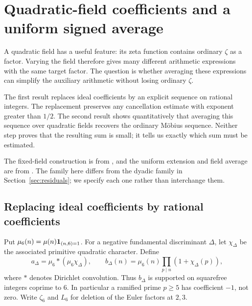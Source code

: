 \section{Quadratic-field coefficients and a uniform signed average}\label{sec:quadratic}

A quadratic field has a useful feature: its zeta function contains ordinary $\zeta$ as a factor. Varying the field therefore gives many different arithmetic expressions with the same target factor. The question is whether averaging these expressions can simplify the auxiliary arithmetic without losing ordinary $\zeta$.

The first result replaces ideal coefficients by an explicit sequence on rational integers. The replacement preserves any cancellation estimate with exponent greater than $1/2$. The second result shows quantitatively that averaging this sequence over quadratic fields recovers the ordinary M\"obius sequence. Neither step proves that the resulting sum is small; it tells us exactly which sum must be estimated.

The fixed-field construction is from \cite{R996}, and the uniform extension and field average are from \cite{R1002}. The family here differs from the dyadic family in Section~\ref{sec:residuals}; we specify each one rather than interchange them.

\subsection{Replacing ideal coefficients by rational coefficients}
Put $\mu_6(n)=\mu(n)\mathbf 1_{(n,6)=1}$. For a negative fundamental discriminant $\Delta$, let $\chi_\Delta$ be the associated primitive quadratic character. Define
\begin{equation}\label{eq:primitive-sequences}
 a_\Delta=\mu_6*(\mu_6\chi_\Delta),\qquad
 b_\Delta(n)=\mu_6(n)\prod_{p\mid n}(1+\chi_\Delta(p)),
\end{equation}
where $*$ denotes Dirichlet convolution. Thus $b_\Delta$ is supported on squarefree integers coprime to $6$. In particular a ramified prime $p\ge5$ has coefficient $-1$, not zero. Write $\zeta_6$ and $L_6$ for deletion of the Euler factors at $2,3$.

